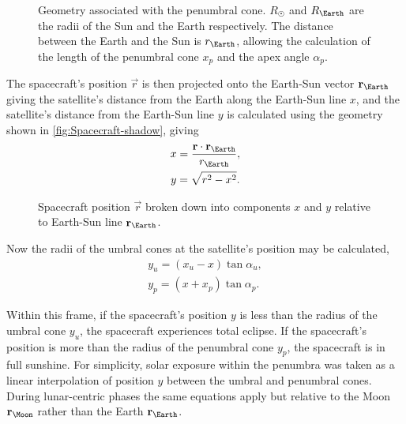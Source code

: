 \begin{figure}
\centering
\def\svgwidth{\textwidth}

\caption{Geometry associated with the penumbral cone. $R_\Sun$ and $R_\Earth$ are the radii of the Sun and the Earth respectively. The distance between the Earth and the Sun is $r_\Earth$, allowing the calculation of the length of the penumbral cone $x_p$ and the apex angle $\alpha_p$.} \label{fig:Penumbra}
\end{figure}

The spacecraft's position $\vec{r}$ is then projected onto the Earth-Sun vector $\vec{r}_\Earth$ giving the satellite's distance from the Earth along the Earth-Sun line $x$, and the satellite's distance from the Earth-Sun line $y$ is calculated using the geometry shown in \autoref{fig:Spacecraft-shadow}, giving
\begin{subequations}
\begin{gather}
x = \frac{\vec{r}\cdot\vec{r_\Earth}}{r_\Earth}, \\
y = \sqrt{r^2-x^2}.
\end{gather}
\end{subequations}

\begin{figure}
\centering
\def\svgwidth{\figurewidth}

\caption{Spacecraft position $\vec{r}$ broken down into components $x$ and $y$ relative to Earth-Sun line $\vec{r}_\Earth$.} \label{fig:Spacecraft-shadow}
\end{figure}

Now the radii of the umbral cones at the satellite's position may be calculated,
\begin{subequations}
\begin{gather}
y_u = (x_u-x)\tan\alpha_u, \\
y_p = (x+x_p)\tan\alpha_p.
\end{gather}
\end{subequations}

Within this frame, if the spacecraft's position $y$ is less than the radius of the umbral cone $y_u$, the spacecraft experiences total eclipse. If the spacecraft's position is more than the radius of the penumbral cone $y_p$, the spacecraft is in full sunshine. For simplicity, solar exposure within the penumbra was taken as a linear interpolation of position $y$ between the umbral and penumbral cones. During lunar-centric phases the same equations apply but relative to the Moon $\vec{r}_\Moon$ rather than the Earth $\vec{r}_\Earth$.

